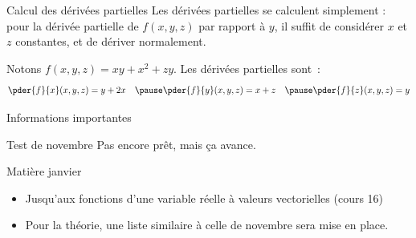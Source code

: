 \begin{frame}
\end{frame}
\begin{frame}{Calcul des dérivées partielles}
  Les dérivées partielles se calculent simplement :\pause{} pour la dérivée partielle de \(f(x,y,z)\) par rapport à \(y\),\pause{} il suffit de considérer \(x\) et \(z\) constantes,\pause{} et de dériver \og normalement\fg{}.\pause{}

  \begin{example}\pause{}
    Notons \(f(x,y,z) = xy+x^{2}+zy\). Les dérivées partielles sont~:\pause{}
    \begin{equation*}
      \pder{f}{x}(x,y,z) = y + 2x \quad\pause
      \pder{f}{y}(x,y,z) = x + z \quad\pause
      \pder{f}{z}(x,y,z) = y
    \end{equation*}
  \end{example}
\end{frame}
\begin{frame}{Informations importantes}
  \begin{block}{Test de novembre}
    Pas encore prêt, mais ça avance.
  \end{block}
  \begin{block}{Matière janvier}
    \begin{itemize}[<+->]
    \item Jusqu'aux fonctions d'une variable réelle à valeurs vectorielles (cours 16)
    \item Pour la théorie, une liste similaire à celle de novembre sera mise en place.
    \end{itemize}
  \end{block}
\end{frame}

